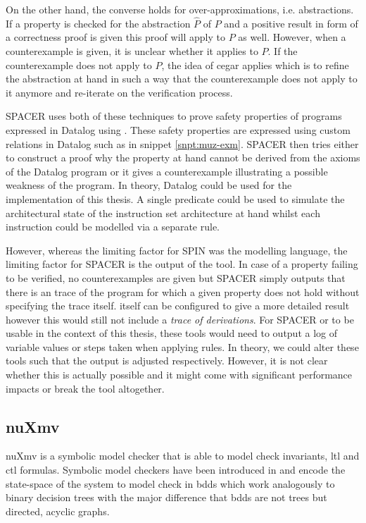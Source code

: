 On the other hand, the converse holds for over-approximations, i.e. abstractions.
If a property is checked for the abstraction $ \hat{P} $ of $ P $ and a positive result in form of a correctness proof is given this proof will apply to $ P $ as well.
However, when a counterexample is given, it is unclear whether it applies to $ P $.
If the counterexample does not apply to $ P $, the idea of \gls{cegar} \cite{Clark00} applies which is to refine the abstraction at hand in such a way that the counterexample does not apply to it anymore and re-iterate on the verification process.

SPACER uses both of these techniques to prove safety properties of programs expressed in Datalog using \muZ{}.
These safety properties are expressed using custom relations in Datalog such as  in snippet \ref{snpt:muz-exm}.
SPACER then tries either to construct a proof why the property at hand cannot be derived from the axioms of the Datalog program or it gives a counterexample illustrating a possible weakness of the program.
In theory, Datalog could be used for the implementation of this thesis.
A single predicate could be used to simulate the architectural state of the instruction set architecture at hand whilst each instruction could be modelled via a separate rule.

However, whereas the limiting factor for SPIN was the modelling language, the limiting factor for SPACER is the output of the tool.
In case of a property failing to be verified, no counterexamples are given but SPACER simply outputs that there is an trace of the program for which a given property does not hold without specifying the trace itself.
\muZ{} itself can be configured to give a more detailed result however this would still not include a \textit{trace of derivations}.
For SPACER or \muZ{} to be usable in the context of this thesis, these tools would need to output a log of variable values or steps taken when applying rules.
In theory, we could alter these tools such that the output is adjusted respectively.
However, it is not clear whether this is actually possible and it might come with significant performance impacts or break the tool altogether.

\subsection{nuXmv}
\label{sec:nuxmv}

nuXmv \cite{Cavada14} is a symbolic model checker that is able to model check invariants, \gls{ltl} and \gls{ctl} formulas.
Symbolic model checkers have been introduced in \cite{Burch92} and encode the state-space of the system to model check in \glspl{bdd} which work analogously to binary decision trees with the major difference that \glspl{bdd} are not trees but directed, acyclic graphs.


